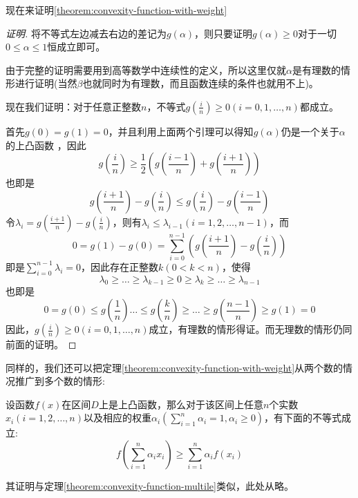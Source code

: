 现在来证明\autoref{theorem:convexity-function-with-weight}
\begin{proof}[证明]
将不等式左边减去右边的差记为$g(\alpha)$，则只要证明$g(\alpha) \geqslant 0$对于一切$0 \leqslant \alpha \leqslant 1$恒成立即可。

  由于完整的证明需要用到高等数学中连续性的定义，所以这里仅就$\alpha$是有理数的情形进行证明(当然$\beta$也就同时为有理数，而且函数连续的条件也就用不上)。

现在我们证明：对于任意正整数$n$，不等式$g(\frac{i}{n}) \geqslant 0 (i=0,1,\ldots,n)$都成立。

首先$g(0)=g(1)=0$，并且利用上面两个引理可以得知$g(\alpha)$仍是一个关于$\alpha$的上凸函数 ，因此
\begin{equation*}
  g(\frac{i}{n}) \geqslant \frac{1}{2} \left( g(\frac{i-1}{n}) + g(\frac{i+1}{n}) \right)
\end{equation*}
也即是
\begin{equation*}
  g(\frac{i+1}{n}) - g(\frac{i}{n}) \leqslant g(\frac{i}{n}) - g(\frac{i-1}{n})
\end{equation*}
令$\lambda_i = g(\frac{i+1}{n}) - g(\frac{i}{n})$，则有$\lambda_i \leqslant \lambda_{i-1}(i=1,2,\ldots,n-1)$，而
\begin{equation*}
 0 = g(1) - g(0) = \sum_{i=0}^{n-1} \left( g(\frac{i+1}{n}) - g(\frac{i}{n}) \right) 
\end{equation*}
即是$\sum_{i=0}^{n-1}\lambda_i=0$，因此存在正整数$k(0<k<n)$，使得
\begin{equation*}
\lambda_0 \geqslant \dots \geqslant \lambda_{k-1} \geqslant 0 \geqslant \lambda_k \geqslant \ldots \geqslant \lambda_{n-1}
\end{equation*}
也即是
\begin{equation*}
  0 = g(0) \leqslant g(\frac{1}{n}) \ldots \leqslant g(\frac{k}{n}) \geqslant \ldots \geqslant g(\frac{n-1}{n}) \geqslant g(1) = 0
\end{equation*}
因此，$g(\frac{i}{n})\geqslant 0(i=0,1,\ldots,n)$成立，有理数的情形得证。而无理数的情形仍同前面的证明。
\end{proof}

同样的，我们还可以把定理\ref{theorem:convexity-function-with-weight}从两个数的情况推广到多个数的情形:
\begin{theorem}
 设函数$f(x)$在区间$D$上是上凸函数，那么对于该区间上任意$n$个实数$x_i(i=1,2,\ldots,n)$以及相应的权重$\alpha_i(\sum_{i=1}^n\alpha_i=1,\alpha_i \geqslant 0)$，有下面的不等式成立:
 \begin{equation}
   \label{eq:convexity-function-with-weight-multiple}
   f \left( \sum_{i=1}^n\alpha_i x_i \right) \geqslant \sum_{i=1}^n\alpha_i f(x_i)
 \end{equation}
\end{theorem}
其证明与定理\ref{theorem:convexity-function-multile}类似，此处从略。


